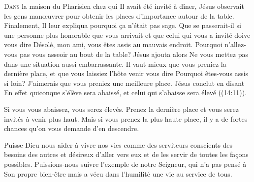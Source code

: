 \dvrule







\lettrine{D}{ans} la maison du Pharisien chez qui Il avait été invité à dîner,
 Jésus observait les gens man\oe{}uvrer pour obtenir les places
 d'importance autour de la table. Finalement, Il leur expliqua pourquoi
 \c{c}a n'était pas sage.
 \Og Que se passerait-il si une personne plus honorable que vous arrivait
 et que celui qui vous a invité doive vous dire\frcolon{} 
 \Og Désolé, mon ami, vous êtes assis au mauvais endroit.
 Pourquoi n'allez-vous pas vous asseoir au bout de la table? \Fg{}
 Jésus ajouta alors\frcolon{} 
 \Og Ne vous mettez pas dans une situation aussi embarrassante.
 Il vaut mieux que vous preniez la dernière place, et que vous laissiez
 l'hôte venir vous dire\frcolon{} 
 \Og Pourquoi êtes-vous assis si loin?
 J'aimerais que vous preniez une meilleure place. \Fg{}
 Jésus conclut en disant\frcolon{}
 \Og En effet quiconque s'élève sera abaissé,
 et celui qui s'abaisse sera élevé \Fg{} ((14:11)).


Si vous vous abaissez, vous serez élevés.
 Prenez la dernière place et vous serez invités à venir plus haut.
 Mais si vous prenez la plus haute place,
 il y a de fortes chances qu'on vous demande d'en descendre.

Puisse Dieu nous aider à vivre nos vies comme des serviteurs
 \ocadr conscients des besoins des autres et désireux d'aller vers eux
 et de les servir de toutes les fa\c{c}ons possibles.
 Puissions-nous suivre l'exemple de notre Seigneur,
 qui n'a pas pensé à Son propre bien-être mais a vécu
 dans l'humilité une vie au service de tous.

